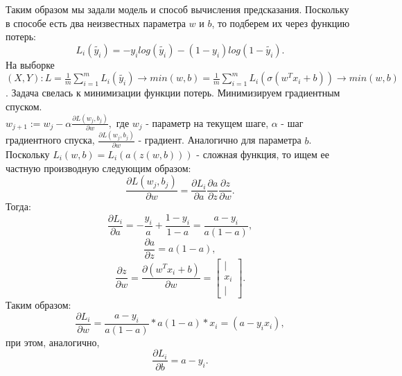 \documentclass[12pt, letterpaper, twoside]{article}
\begin{document}
Таким образом мы задали модель и способ вычисления предсказания. Поскольку в способе есть два неизвестных параметра $w$ и $b$, то подберем их через функцию потерь: $$L_{i}(\widetilde{y_{i}}) = -y_{i}log(\widetilde{y_{i}}) - (1-y_{i})log(1-\widetilde{y_{i}}).$$ На выборке $(X, Y): L = \frac{1}{m}\sum_{i=1}^{m}L_{i}(\widetilde{y_{i}}) \rightarrow min(w,b) = \frac{1}{m}\sum_{i=1}^{m}L_{i}(\sigma(w^{T}x_{i}+b)) \rightarrow min(w,b)$. Задача свелась к минимизации функции потерь. Минимизируем градиентным спуском. \\

$w_{j+1} := w_{j} - \alpha\frac{\partial L(w_{j}, b_{j})}{\partial w},$ где $w_{j}$ - параметр на текущем шаге, $\alpha$ - шаг градиентного спуска, $\frac{\partial L(w_{j}, b_{j})}{\partial w}$ - градиент. Аналогично для параметра $b$. \\

Поскольку $L_{i}(w,b) = L_{i}(a(z(w,b)))$ - сложная функция, то ищем ее частную производную следующим образом: $$\frac{\partial L(w_{j}, b_{j})}{\partial w} = \frac{\partial L_{i}}{\partial a}\frac{\partial a}{\partial z}\frac{\partial z}{\partial w}.$$ Тогда: $$\frac{\partial L_{i}}{\partial a} = -\frac{y_{i}}{a} + \frac{1-y_{i}}{1-a} = \frac{a-y_{i}}{a(1-a)},$$ $$\frac{\partial a}{\partial z} = a(1-a),$$ $$\frac{\partial z}{\partial w} = \frac{\partial (w^{T}x_{i}+b)}{\partial w} = \begin{bmatrix}
	| \\
	x_{i} \\
	|
\end{bmatrix}.$$ Таким образом: $$\frac{\partial L_{i}}{\partial w} = \frac{a-y_{i}}{a(1-a)}*a(1-a)*x_{i} = (a-y_{i}x_{i}),$$ при этом, аналогично, $$\frac{\partial L_{i}}{\partial b} = a-y_{i}.$$
\end{document}
